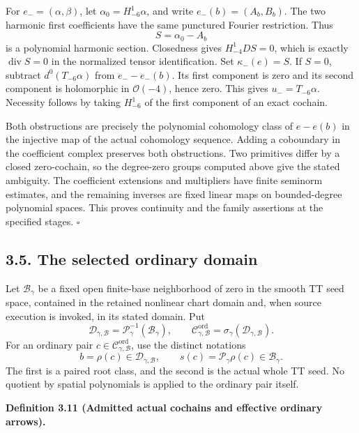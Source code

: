 \documentclass[
  english,
  11pt,
  reqno]{amsart}
\makeatletter
\newcommand{\pandocstatementheading}[1]{%
  \par\if@nobreak\else
    \addpenalty{\@beginparpenalty}%
    \addvspace{.5\baselineskip plus .2\baselineskip minus .2\baselineskip}%
  \fi
  {\normalfont\bfseries #1\par}%
  \nobreak\@afterindenttrue\@afterheading
}
\makeatother
\begin{document}
For \(e_-=(\alpha,\beta)\), let \(\alpha_0=H_{-6}^1\alpha\), and write
\(e_-(b)=(A_b,B_b)\). The two harmonic first coefficients have the same
punctured Fourier restriction. Thus \[
S=\alpha_0-A_b
\] is a polynomial harmonic section. Closedness gives \(H_{-4}^1DS=0\),
which is exactly \(\operatorname{div}S=0\) in the normalized tensor
identification. Set \(\kappa_-(e)=S\). If \(S=0\), subtract
\(d^0(T_{-6}\alpha)\) from \(e_--e_-(b)\). Its first component is zero
and its second component is holomorphic in \(\mathcal O(-4)\), hence
zero. This gives \(u_-=T_{-6}\alpha\). Necessity follows by taking
\(H_{-6}^1\) of the first component of an exact cochain.

Both obstructions are precisely the polynomial cohomology class of
\(e-e(b)\) in the injective map of the actual cohomology sequence.
Adding a coboundary in the coefficient complex preserves both
obstructions. Two primitives differ by a closed zero-cochain, so the
degree-zero groups computed above give the stated ambiguity. The
coefficient extensions and multipliers have finite seminorm estimates,
and the remaining inverses are fixed linear maps on bounded-degree
polynomial spaces. This proves continuity and the family assertions at
the specified stages. \hfill\(\square\)

\subsection{3.5. The selected ordinary
domain}\label{the-selected-ordinary-domain}\label{sec:online-selected-ordinary-domain}

Let \(\mathcal B_\gamma\) be a fixed open finite-base neighborhood of
zero in the smooth TT seed space, contained in the retained nonlinear
chart domain and, when source execution is invoked, in its stated
domain. Put%
 \[
\mathscr D_{\gamma,\mathcal B}=\mathscr P_\gamma^{-1}(\mathcal B_\gamma),
\qquad
\mathscr C^{\mathrm{ord}}_{\gamma,\mathcal B}
=\sigma_\gamma(\mathscr D_{\gamma,\mathcal B}).
\] For an ordinary pair
\(c\in\mathscr C^{\mathrm{ord}}_{\gamma,\mathcal B}\), use the distinct
notations%
 \[
b=\rho(c)\in\mathscr D_{\gamma,\mathcal B},
\qquad
s(c)=\mathscr P_\gamma\rho(c)\in\mathcal B_\gamma.
\] The first is a paired root class, and the second is the actual whole
TT seed. No quotient by spatial polynomials is applied to the ordinary
pair itself.

\pandocstatementheading{\leavevmode{}\label{def:online-effective-ordinary-cochain-domain}Definition 3.11 (Admitted actual cochains and effective ordinary
arrows).}
\end{document}
